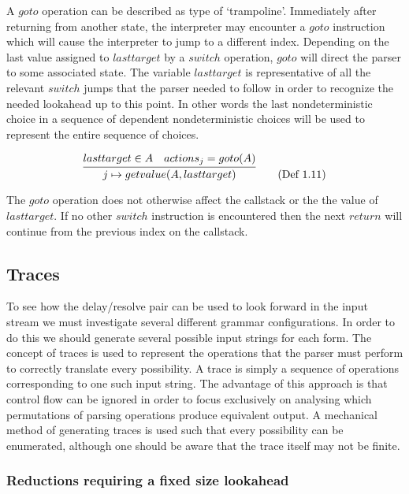 \documentclass[a4paper,11pt]{article}
\begin{document}
A $goto$ operation can be described as type of `trampoline'. 
Immediately after returning from another state, the interpreter may encounter a $goto$ instruction which will cause the interpreter to jump to a different index.
Depending on the last value assigned to $lasttarget$ by a $switch$ operation, $goto$ will direct the parser to some associated state. 
The variable $lasttarget$ is representative of all the relevant $switch$ jumps that the parser needed to follow in order to recognize the needed lookahead up to this point.
In other words the last nondeterministic choice in a sequence of dependent nondeterministic choices will be used to represent the entire sequence of choices.

\begin{equation}
\infer{j \mapsto getvalue(A, lasttarget)}{lasttarget \in A & actions_j = goto(A)} \tag{Def 1.11}
\end{equation}

The $goto$ operation does not otherwise affect the callstack or the the value of $lasttarget$. 
If no other $switch$ instruction is encountered then the next $return$ will continue from the previous index on the callstack.

\subsection{Traces}
To see how the delay/resolve pair can be used to look forward in the input stream we must investigate several different grammar configurations.
In order to do this we should generate several possible input strings for each form.
The concept of traces is used to represent the operations that the parser must perform to correctly translate every possibility.
A trace is simply a sequence of operations corresponding to one such input string.
The advantage of this approach is that control flow can be ignored in order to focus exclusively on analysing which permutations of parsing operations produce equivalent output.
A mechanical method of generating traces is used such that every possibility can be enumerated, although one should be aware that the trace itself may not be finite.\\

\subsubsection{Reductions requiring a fixed size lookahead}
\end{document}
